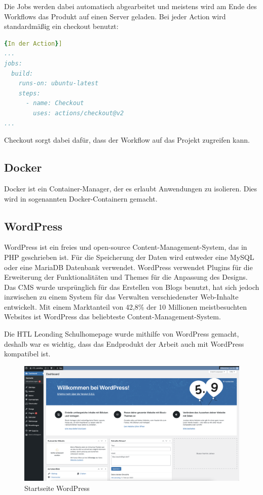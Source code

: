 Die Jobs werden dabei automatisch abgearbeitet und meistens wird am Ende des Workflows das Produkt auf einen Server geladen.
Bei jeder Action wird standardmäßig ein checkout benutzt:

\begin{lstlisting}[language=yaml,label={lst:checkout},caption={In der Action}]{In der Action}]
...
jobs:
  build:
    runs-on: ubuntu-latest
    steps:
      - name: Checkout
        uses: actions/checkout@v2
...
\end{lstlisting}

Checkout sorgt dabei dafür, dass der Workflow auf das Projekt zugreifen kann.

\subsection{Docker}
Docker ist ein Container-Manager, der es erlaubt Anwendungen zu isolieren.
Dies wird in sogenannten Docker-Containern gemacht.

\subsection{WordPress}
WordPress ist ein freies und open-source Content-Management-System, das in PHP geschrieben ist.
Für die Speicherung der Daten wird entweder eine MySQL oder eine MariaDB Datenbank verwendet.
WordPress verwendet Plugins für die Erweiterung der Funktionalitäten und Themes für die Anpassung des Designs.
Das CMS wurde ursprünglich für das Erstellen von Blogs benutzt, hat sich jedoch inzwischen zu einem System für das Verwalten verschiedenster Web-Inhalte entwickelt.
Mit einem Marktanteil von 42,8\% der 10 Millionen meistbesuchten Websites ist WordPress das beliebteste Content-Management-System.

Die HTL Leonding Schulhomepage wurde mithilfe von WordPress gemacht, deshalb war es wichtig, dass das Endprodukt der Arbeit auch mit WordPress kompatibel ist.


\begin{figure}[hbt!]
    \centering
    \includegraphics[scale=0.25]{pics/wordpresshome}
    \caption{Startseite WordPress}
    \label{fig:impl:wordpresshome}
\end{figure}


